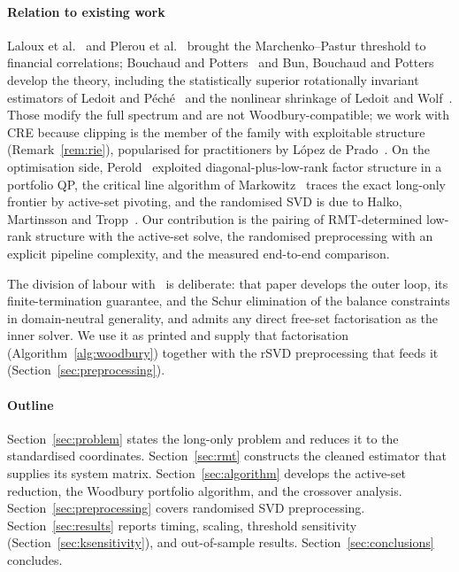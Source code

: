 \paragraph{Relation to existing work}
Laloux et al.~\cite{laloux1999} and Plerou et al.~\cite{plerou1999} brought the
Marchenko--Pastur threshold to financial correlations; Bouchaud and
Potters~\cite{bouchaud2003} and Bun, Bouchaud and Potters~\cite{bun2017} develop
the theory, including the statistically superior rotationally invariant estimators
of Ledoit and P\'ech\'e~\cite{ledoitpeche2011} and the nonlinear shrinkage of
Ledoit and Wolf~\cite{ledoit2012,ledoit2020}. Those modify the full spectrum and
are not Woodbury-compatible; we work with CRE because clipping is the member of the
family with exploitable structure (Remark~\ref{rem:rie}), popularised for
practitioners by L\'opez de Prado~\cite{lopezdeprado2018}. On the optimisation
side, Perold~\cite{perold1984} exploited diagonal-plus-low-rank factor structure in
a portfolio QP, the critical line algorithm of
Markowitz~\cite{markowitz1956,niedermayer2010,cvxcla} traces the exact long-only
frontier by active-set pivoting, and the randomised SVD is due to Halko, Martinsson
and Tropp~\cite{halko2011}. Our contribution is the pairing of RMT-determined
low-rank structure with the active-set solve, the randomised preprocessing with an
explicit pipeline complexity, and the measured end-to-end comparison.

The division of labour with~\cite{schmelzer2026nncg} is deliberate: that paper
develops the outer loop, its finite-termination guarantee, and the Schur
elimination of the balance constraints in domain-neutral generality, and admits
any direct free-set factorisation as the inner solver. We use it as printed and
supply that factorisation (Algorithm~\ref{alg:woodbury}) together with the rSVD
preprocessing that feeds it (Section~\ref{sec:preprocessing}).

\paragraph{Outline}
Section~\ref{sec:problem} states the long-only problem and reduces it to the
standardised coordinates. Section~\ref{sec:rmt} constructs the cleaned estimator
that supplies its system matrix.
Section~\ref{sec:algorithm} develops the active-set reduction, the Woodbury
portfolio algorithm, and the crossover analysis. Section~\ref{sec:preprocessing} covers
randomised SVD preprocessing. Section~\ref{sec:results} reports timing, scaling,
threshold sensitivity (Section~\ref{sec:ksensitivity}), and out-of-sample
results. Section~\ref{sec:conclusions} concludes.
